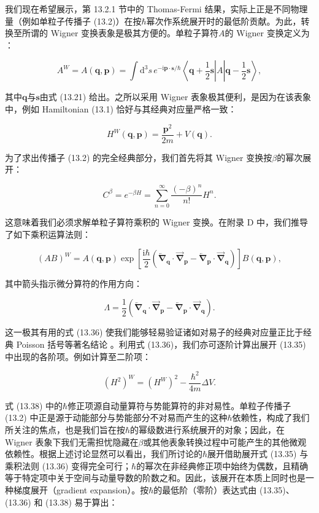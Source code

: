 我们现在希望展示，第 13.2.1 节中的 Thomas-Fermi 结果，实际上正是不同物理量（例如单粒子传播子 (13.2)）在按$\hbar$幂次作系统展开时的最低阶贡献。为此，转换至所谓的
Wigner 变换表象是极其方便的。单粒子算符$A$的 Wigner 变换定义为 \cite{Ar65}：

\[
A^{W}=A(\boldsymbol{q},\boldsymbol{p})=\int\mathrm{d}^{3}s\,e^{-\mathrm{i}\boldsymbol{p}\cdot\boldsymbol{s}/\hbar}\left\langle \boldsymbol{q}+\frac{1}{2}\boldsymbol{s}\right|A\left|\boldsymbol{q}-\frac{1}{2}\boldsymbol{s}\right\rangle ,
\]

其中$\boldsymbol{q}$与$\boldsymbol{s}$由式 (13.21) 给出。之所以采用 Wigner 表象极其便利，是因为在该表象中，例如
Hamiltonian (13.1) 恰好与其经典对应量严格一致：

\[
H^{W}(\boldsymbol{q},\boldsymbol{p})=\frac{\boldsymbol{p}^{2}}{2m}+V(\boldsymbol{q}).
\]

为了求出传播子 (13.2) 的完全经典部分，我们首先将其 Wigner 变换按$\beta$的幂次展开：

\[
C^{\beta}=e^{-\beta H}=\sum^{\infty}_{n=0}\frac{(-\beta)^{n}}{n!}H^{n}.
\]

这意味着我们必须求解单粒子算符乘积的 Wigner 变换。在附录 D 中，我们推导了如下乘积运算法则：

\[
(AB)^{W}=A(\boldsymbol{q},\boldsymbol{p})\exp\left[\frac{\mathrm{i}\hbar}{2}\left(\overleftarrow{\boldsymbol{\nabla}}_{\boldsymbol{q}}\cdot\overrightarrow{\boldsymbol{\nabla}}_{\boldsymbol{p}}-\overleftarrow{\boldsymbol{\nabla}}_{\boldsymbol{p}}\cdot\overrightarrow{\boldsymbol{\nabla}}_{\boldsymbol{q}}\right)\right]B(\boldsymbol{q},\boldsymbol{p}),
\]

其中箭头指示微分算符的作用方向：

\[
\Lambda=\frac{1}{2}\left(\overleftarrow{\boldsymbol{\nabla}}_{\boldsymbol{q}}\cdot\overrightarrow{\boldsymbol{\nabla}}_{\boldsymbol{p}}-\overleftarrow{\boldsymbol{\nabla}}_{\boldsymbol{p}}\cdot\overrightarrow{\boldsymbol{\nabla}}_{\boldsymbol{q}}\right).
\]

这一极其有用的式 (13.36) 使我们能够轻易验证诸如对易子的经典对应量正比于经典 Poisson 括号等著名结论 \cite{Go59}。利用式
(13.36)，我们亦可逐阶计算出展开 (13.35) 中出现的各阶项。例如计算至二阶项：

\[
(H^{2})^{W}=(H^{W})^{2}-\frac{\hbar^{2}}{4m}\Delta V.
\]

式 (13.38) 中的$\hbar$修正项源自动量算符与势能算符的非对易性。单粒子传播子 (13.2) 中正是源于动能部分与势能部分不对易而产生的这种$\hbar$依赖性，构成了我们所关注的焦点，也是我们旨在按$\hbar$的幂级数进行系统展开的对象；因此，在
Wigner 表象下我们无需担忧隐藏在$\beta$或其他表象转换过程中可能产生的其他微观依赖性。根据上述讨论显然可以看出，我们所讨论的$\hbar$展开借助展开式
(13.35) 与乘积法则 (13.36) 变得完全可行；$\hbar$的幂次在非经典修正项中始终为偶数，且精确等于特定项中关于空间与动量导数的阶数之和。因此，该展开在本质上同时也是一种梯度展开（gradient
expansion）。按$\hbar$的最低阶（零阶）表达式由 (13.35)、(13.36) 和 (13.38) 易于算出：

